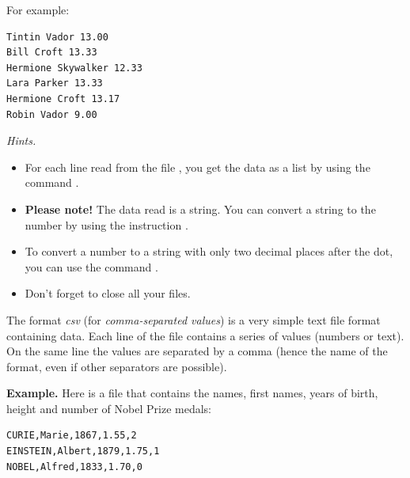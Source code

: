 \documentclass[11pt,class=report,crop=false]{standalone}
\begin{document}
\begin{activite}
\begin{enumerate}
For example:  
\begin{center}
\begin{minipage}{0.5\textwidth}
\begin{lstlisting}
Tintin Vador 13.00
Bill Croft 13.33
Hermione Skywalker 12.33
Lara Parker 13.33
Hermione Croft 13.17
Robin Vador 9.00
\end{lstlisting}
\end{minipage}
\end{center}   
  

%    

  \emph{Hints.}
  \begin{itemize}
    	\item For each line read from the file , you get the data as a list by using the command .
    	
    	\item \textbf{Please note!} The data read is a string. You can convert a string  to the number  by using the instruction .
    	
    	\item To convert a number to a string with only two decimal places after the dot, you can use the command .
    	
    	\item Don't forget to close all your files.
    	
   \end{itemize}
    
\end{enumerate}   
     
\end{activite}



\begin{cours}
The format \emph{csv} (for \emph{comma-separated values}) is a very simple text file format containing data.
Each line of the file contains a series of values (numbers or text). On the same line the values are separated by a comma (hence the name of the format, even if other separators are possible).

\medskip

\textbf{Example.} Here is a file that contains the names, first names, years of birth, height and number of Nobel Prize medals:
\begin{center}
\begin{minipage}{0.4\textwidth}
\begin{lstlisting}
CURIE,Marie,1867,1.55,2
EINSTEIN,Albert,1879,1.75,1
NOBEL,Alfred,1833,1.70,0
\end{lstlisting}
\end{minipage}
\end{center}

\end{cours}
\end{document}
